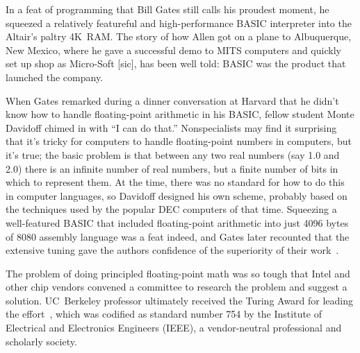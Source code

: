In a feat of programming that Bill Gates still calls his proudest
moment, he squeezed a relatively featureful and high-performance BASIC
interpreter into the Altair's paltry 4K~RAM.
The story of how Allen got on a plane to Albuquerque, New Mexico, where
he gave a successful demo to MITS computers and quickly set up shop as
Micro-Soft [sic], has been well told: BASIC was the product that
launched the company.

When Gates remarked during a dinner
conversation at Harvard that he didn't
know how to handle floating-point arithmetic in his BASIC,
fellow student Monte Davidoff chimed in with ``I can do that.''
Nonspecialists may find it surprising that it's tricky for computers to handle
floating-point
numbers in computers, but it's true; the basic problem is that between
any two real numbers (say 1.0 and 2.0) there is an infinite number of
real numbers, but a finite number of bits in which to represent them.
At the time, there was no standard for how to do this in
computer languages, so Davidoff designed his own scheme, probably based
on the techniques used by the popular DEC computers of that time.
Squeezing a well-featured BASIC that included floating-point arithmetic
into just 
4096 bytes of 8080 assembly language was a feat indeed, and Gates later
recounted that the extensive tuning
gave the authors confidence of the superiority of their
work~\cite{programmers_at_work}.  

  \begin{geeknote}
  The problem of doing principled
  floating-point math was so tough that Intel 
  and other chip vendors convened a committee to research the problem
  and suggest a solution. UC~Berkeley professor 
  ultimately received the 
  Turing Award for
  leading the effort~\cite{kahan_interview}, which was codified as
  standard number 754 by the  Institute of Electrical and 
  Electronics Engineers (IEEE), a vendor-neutral professional and scholarly
  society. 
  \end{geeknote}

